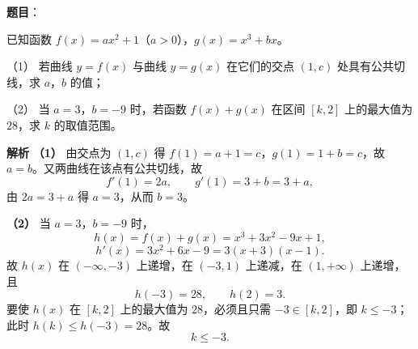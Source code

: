 \begin{answer}

\textbf{题目}：

已知函数 $f(x)=ax^2+1$（$a>0$），$g(x)=x^3+bx$。

（1） 若曲线 $y=f(x)$ 与曲线 $y=g(x)$ 在它们的交点 $(1,c)$ 处具有公共切线，求 $a$，$b$ 的值；

（2） 当 $a=3$，$b=-9$ 时，若函数 $f(x)+g(x)$ 在区间 $[k,2]$ 上的最大值为 $28$，求 $k$ 的取值范围。

\textbf{解析}
\textbf{（1）} 由交点为 $(1,c)$ 得 $f(1)=a+1=c$，$g(1)=1+b=c$，故 $a=b$。又两曲线在该点有公共切线，故
\nopagebreak[4]
\[f'(1)=2a,\qquad g'(1)=3+b=3+a,\]
由 $2a=3+a$ 得 $a=3$，从而 $b=3$。

\textbf{（2）} 当 $a=3$，$b=-9$ 时，
\nopagebreak[4]
\[h(x)=f(x)+g(x)=x^3+3x^2-9x+1,\]
\nopagebreak[4]
\[h'(x)=3x^2+6x-9=3(x+3)(x-1).\]
故 $h(x)$ 在 $(-\infty,-3)$ 上递增，在 $(-3,1)$ 上递减，在 $(1,+\infty)$ 上递增，且
\nopagebreak[4]
\[h(-3)=28,\qquad h(2)=3.\]
要使 $h(x)$ 在 $[k,2]$ 上的最大值为 $28$，必须且只需 $-3\in[k,2]$，即 $k\leqslant-3$；此时 $h(k)\leqslant h(-3)=28$。故
\nopagebreak[4]
\[k\leqslant-3.\]



\end{answer}
